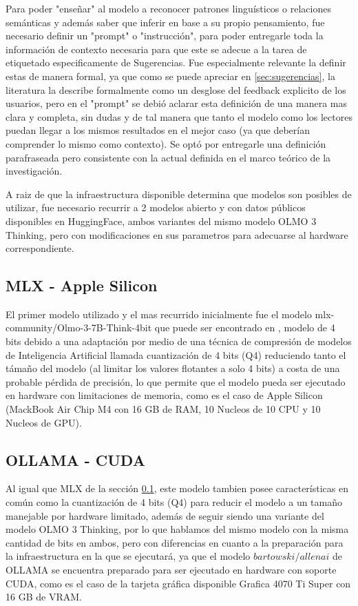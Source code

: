 Para poder "enseñar" al modelo a reconocer patrones linguísticos o relaciones semánticas y además saber que inferir en base a su propio pensamiento, fue necesario definir un "prompt" o "instrucción", para poder entregarle toda la información de contexto necesaria para que este se adecue a la tarea de etiquetado especificamente de Sugerencias. Fue especialmente relevante la definir estas de manera formal, ya que como se puede apreciar en \ref{sec:sugerencias}, la literatura la describe formalmente como un desglose del feedback explicito de los usuarios, pero en el "prompt" se debió aclarar esta definición de una manera mas clara y completa, sin dudas y de tal manera que tanto el modelo como los lectores puedan llegar a los mismos resultados en el mejor caso (ya que deberían comprender lo mismo como contexto). Se optó por entregarle una definición parafraseada pero consistente con la actual definida en el marco teórico de la investigación.

A raiz de que la infraestructura disponible determina que modelos son posibles de utilizar, fue necesario recurrir a 2 modelos abierto y con datos públicos disponibles en HuggingFace, ambos variantes del mismo modelo OLMO 3 Thinking, pero con modificaciones en sus parametros para adecuarse al hardware correspondiente.

\subsection{MLX - Apple Silicon}
\label{sec:mlx}
El primer modelo utilizado y el mas recurrido inicialmente fue el modelo mlx-community/Olmo-3-7B-Think-4bit que puede ser encontrado en \textcite{olmo3-7b-think-mlx}, modelo de 4 bits debido a una adaptación por medio de una técnica de compresión de modelos de Inteligencia Artificial llamada cuantización de 4 bits (Q4) reduciendo tanto el támaño del modelo (al limitar los valores flotantes a solo 4 bits) a costa de una probable pérdida de precisión, lo que permite que el modelo pueda ser ejecutado en hardware con limitaciones de memoria, como es el caso de Apple Silicon (MackBook Air Chip M4 con 16 GB de RAM, 10 Nucleos de 10 CPU y 10 Nucleos de GPU).

\subsection{OLLAMA - CUDA}
\label{sec:ollama}

Al igual que MLX de la sección \ref{sec:mlx}, este modelo tambien posee características en común como la cuantización de 4 bits (Q4) para reducir el modelo a un tamaño manejable por hardware limitado, además de seguir siendo una variante del modelo OLMO 3 Thinking, por lo que hablamos del mismo modelo con la misma cantidad de bits en ambos, pero con diferencias en cuanto a la preparación para la infraestructura en la que se ejecutará, ya que el modelo $bartowski/allenai$ de OLLAMA \textcite{olmo3-7b-think-gguf} se encuentra preparado para ser ejecutado en hardware con soporte CUDA, como es el caso de la tarjeta gráfica disponible Grafica 4070 Ti Super con 16 GB de VRAM.

